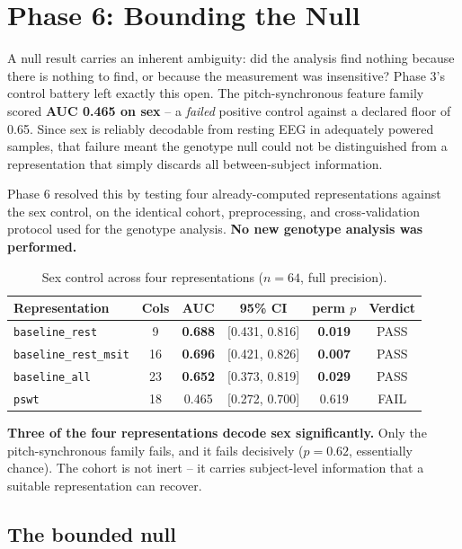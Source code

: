 \documentclass[11pt]{article}
\begin{document}
\section{Phase 6: Bounding the Null}

A null result carries an inherent ambiguity: did the analysis find nothing
because there is nothing to find, or because the measurement was insensitive?
Phase 3's control battery left exactly this open. The pitch-synchronous feature
family scored \textbf{AUC 0.465 on sex} -- a \emph{failed} positive control
against a declared floor of 0.65. Since sex is reliably decodable from resting
EEG in adequately powered samples, that failure meant the genotype null could not
be distinguished from a representation that simply discards all between-subject
information.

Phase 6 resolved this by testing four already-computed representations against
the sex control, on the identical cohort, preprocessing, and cross-validation
protocol used for the genotype analysis. \textbf{No new genotype analysis was
performed.}

\begin{table}[h]
\centering
\caption{Sex control across four representations ($n=64$, full precision).}
\begin{tabular}{lccccc}
\toprule
Representation & Cols & AUC & 95\% CI & perm $p$ & Verdict \\
\midrule
\texttt{baseline\_rest} & 9 & \textbf{0.688} & [0.431, 0.816] & \textbf{0.019} & PASS \\
\texttt{baseline\_rest\_msit} & 16 & \textbf{0.696} & [0.421, 0.826] & \textbf{0.007} & PASS \\
\texttt{baseline\_all} & 23 & \textbf{0.652} & [0.373, 0.819] & \textbf{0.029} & PASS \\
\texttt{pswt} & 18 & 0.465 & [0.272, 0.700] & 0.619 & FAIL \\
\bottomrule
\end{tabular}
\end{table}

\textbf{Three of the four representations decode sex significantly.} Only the
pitch-synchronous family fails, and it fails decisively ($p=0.62$, essentially
chance). The cohort is not inert -- it carries subject-level information that a
suitable representation can recover.

\subsection{The bounded null}
\end{document}
